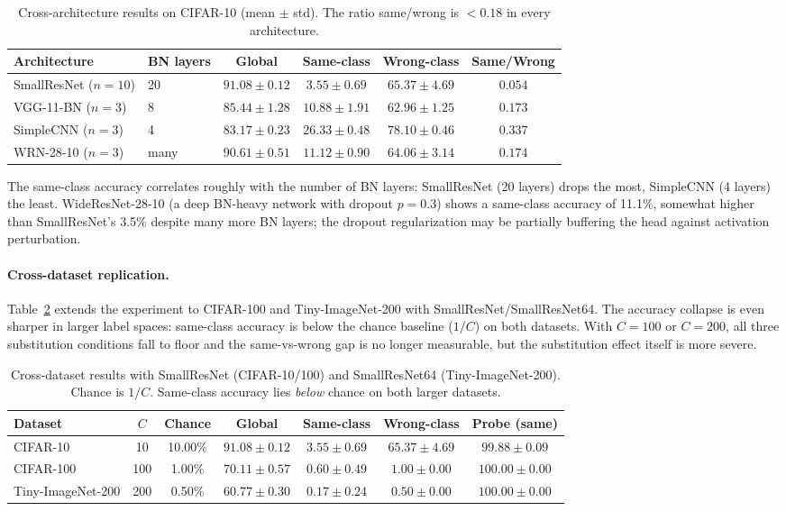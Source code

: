 \documentclass{article}
\begin{document}
\begin{table}[t]
\caption{Cross-architecture results on CIFAR-10 (mean $\pm$ std). The ratio same/wrong is $<0.18$ in every architecture.}
\label{tab:cross_arch}
\centering
\small
\begin{tabular}{@{}llcccc@{}}
\toprule
Architecture & BN layers & Global & Same-class & Wrong-class & Same/Wrong \\
\midrule
SmallResNet ($n=10$)  & 20   & $91.08 \pm 0.12$ & $3.55 \pm 0.69$  & $65.37 \pm 4.69$ & $0.054$ \\
VGG-11-BN ($n=3$)     & 8    & $85.44 \pm 1.28$ & $10.88 \pm 1.91$ & $62.96 \pm 1.25$ & $0.173$ \\
SimpleCNN ($n=3$)     & 4    & $83.17 \pm 0.23$ & $26.33 \pm 0.48$ & $78.10 \pm 0.46$ & $0.337$ \\
WRN-28-10 ($n=3$)     & many & $90.61 \pm 0.51$ & $11.12 \pm 0.90$ & $64.06 \pm 3.14$ & $0.174$ \\
\bottomrule
\end{tabular}
\end{table}

The same-class accuracy correlates roughly with the number of BN layers: SmallResNet (20 layers) drops the most, SimpleCNN (4 layers) the least. WideResNet-28-10 (a deep BN-heavy network with dropout $p{=}0.3$) shows a same-class accuracy of 11.1\%, somewhat higher than SmallResNet's 3.5\% despite many more BN layers; the dropout regularization may be partially buffering the head against activation perturbation.

\paragraph{Cross-dataset replication.} Table~\ref{tab:cross_data} extends the experiment to CIFAR-100 and Tiny-ImageNet-200 with SmallResNet/SmallResNet64. The accuracy collapse is even sharper in larger label spaces: same-class accuracy is below the chance baseline ($1/C$) on both datasets. With $C=100$ or $C=200$, all three substitution conditions fall to floor and the same-vs-wrong gap is no longer measurable, but the substitution effect itself is more severe.

\begin{table}[t]
\caption{Cross-dataset results with SmallResNet (CIFAR-10/100) and SmallResNet64 (Tiny-ImageNet-200). Chance is $1/C$. Same-class accuracy lies \emph{below} chance on both larger datasets.}
\label{tab:cross_data}
\centering
\small
\begin{tabular}{@{}lcccccc@{}}
\toprule
Dataset & $C$ & Chance & Global & Same-class & Wrong-class & Probe (same) \\
\midrule
CIFAR-10           & 10  & 10.00\% & $91.08 \pm 0.12$ & $3.55 \pm 0.69$ & $65.37 \pm 4.69$ & $99.88 \pm 0.09$ \\
CIFAR-100          & 100 & 1.00\%  & $70.11 \pm 0.57$ & $0.60 \pm 0.49$ & $1.00 \pm 0.00$  & $100.00 \pm 0.00$ \\
Tiny-ImageNet-200  & 200 & 0.50\%  & $60.77 \pm 0.30$ & $0.17 \pm 0.24$ & $0.50 \pm 0.00$  & $100.00 \pm 0.00$ \\
\bottomrule
\end{tabular}
\end{table}
\end{document}
